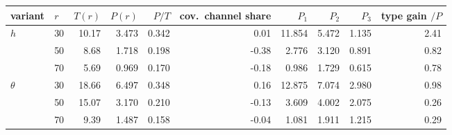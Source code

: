 \begin{tabular}{llrrrrrrrr}
\toprule
variant & $r$ & $T(r)$ & $P(r)$ & $P/T$ & cov.\ channel share & $P_1$ & $P_2$ & $P_3$ & type gain $/P$ \\
\midrule
$h$ & 30 & 10.17 & 3.473 & 0.342 & 0.01 & 11.854 & 5.472 & 1.135 & 2.41 \\
 & 50 & 8.68 & 1.718 & 0.198 & -0.38 & 2.776 & 3.120 & 0.891 & 0.82 \\
 & 70 & 5.69 & 0.969 & 0.170 & -0.18 & 0.986 & 1.729 & 0.615 & 0.78 \\
$\theta$ & 30 & 18.66 & 6.497 & 0.348 & 0.16 & 12.875 & 7.074 & 2.980 & 0.98 \\
 & 50 & 15.07 & 3.170 & 0.210 & -0.13 & 3.609 & 4.002 & 2.075 & 0.26 \\
 & 70 & 9.39 & 1.487 & 0.158 & -0.04 & 1.081 & 1.911 & 1.215 & 0.29 \\
\bottomrule
\end{tabular}
